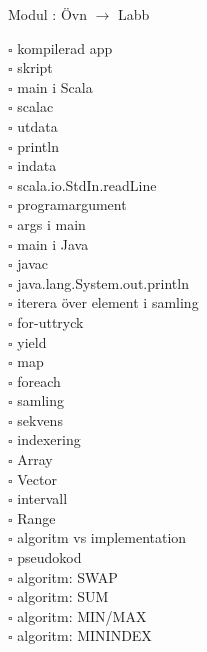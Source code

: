 
    Modul : Övn  $\rightarrow$ Labb \Alert{\texttt{--}}
    \begin{multicols}{3}\SlideFontTiny
    $\square$ kompilerad app \\
$\square$ skript \\
$\square$ main i Scala \\
$\square$ scalac \\
$\square$ utdata \\
$\square$ println \\
$\square$ indata \\
$\square$ scala.io.StdIn.readLine \\
$\square$ programargument \\
$\square$ args i main \\
$\square$ main i Java \\
$\square$ javac \\
$\square$ java.lang.System.out.println \\
$\square$ iterera över element i samling \\
$\square$ for-uttryck \\
$\square$ yield \\
$\square$ map \\
$\square$ foreach \\
$\square$ samling \\
$\square$ sekvens \\
$\square$ indexering \\
$\square$ Array \\
$\square$ Vector \\
$\square$ intervall \\
$\square$ Range \\
$\square$ algoritm vs implementation \\
$\square$ pseudokod \\
$\square$ algoritm: SWAP \\
$\square$ algoritm: SUM \\
$\square$ algoritm: MIN/MAX \\
$\square$ algoritm: MININDEX \\
    \end{multicols}
    
